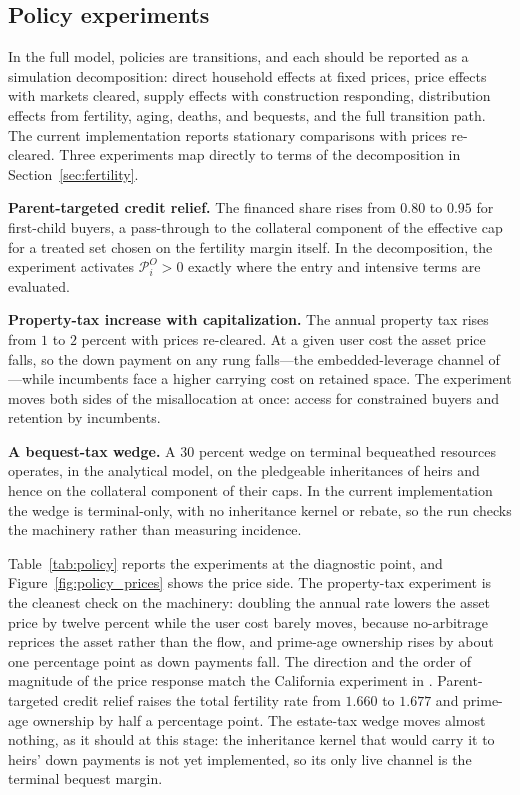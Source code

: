 \documentclass[11pt]{article}
\newcommand{\1}{\mathbf 1}
\begin{document}
\subsection{Policy experiments}
\label{sec:quant_policy}

In the full model, policies are transitions, and each should be reported as a simulation decomposition: direct household effects at fixed prices, price effects with markets cleared, supply effects with construction responding, distribution effects from fertility, aging, deaths, and bequests, and the full transition path. The current implementation reports stationary comparisons with prices re-cleared. Three experiments map directly to terms of the decomposition in Section~\ref{sec:fertility}.

\textbf{Parent-targeted credit relief.} The financed share rises from $0.80$ to $0.95$ for first-child buyers, a pass-through to the collateral component of the effective cap for a treated set chosen on the fertility margin itself. In the decomposition, the experiment activates $\mathcal P_i^O>0$ exactly where the entry and intensive terms are evaluated.

\textbf{Property-tax increase with capitalization.} The annual property tax rises from $1$ to $2$ percent with prices re-cleared. At a given user cost the asset price falls, so the down payment on any rung falls---the embedded-leverage channel of \citet{coven2024}---while incumbents face a higher carrying cost on retained space. The experiment moves both sides of the misallocation at once: access for constrained buyers and retention by incumbents.

\textbf{A bequest-tax wedge.} A $30$ percent wedge on terminal bequeathed resources operates, in the analytical model, on the pledgeable inheritances of heirs and hence on the collateral component of their caps. In the current implementation the wedge is terminal-only, with no inheritance kernel or rebate, so the run checks the machinery rather than measuring incidence.

Table~\ref{tab:policy} reports the experiments at the diagnostic point, and Figure~\ref{fig:policy_prices} shows the price side. The property-tax experiment is the cleanest check on the machinery: doubling the annual rate lowers the asset price by twelve percent while the user cost barely moves, because no-arbitrage reprices the asset rather than the flow, and prime-age ownership rises by about one percentage point as down payments fall. The direction and the order of magnitude of the price response match the California experiment in \citet{coven2024}. Parent-targeted credit relief raises the total fertility rate from $1.660$ to $1.677$ and prime-age ownership by half a percentage point. The estate-tax wedge moves almost nothing, as it should at this stage: the inheritance kernel that would carry it to heirs' down payments is not yet implemented, so its only live channel is the terminal bequest margin.
\end{document}
